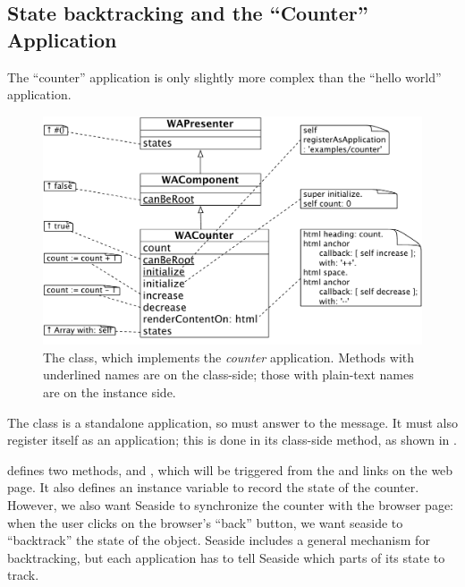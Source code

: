 \documentclass[a4paper,10pt,twoside]{book}
\begin{document}
\subsection{State backtracking and the ``Counter'' Application}

The ``counter'' application is only slightly more complex than the ``hello world'' application.
\label{sec:backtracking}

\begin{figure}[ht]
\begin{center}
\includegraphics[width=\textwidth]{WACounter}
\caption{The  class, which implements the \emph{counter} application.  Methods with underlined names are on the class-side; those with plain-text names are on the instance side.}
\label{fig:WACounter}
\end{center}
\end{figure}

The class  is a standalone application, so  must answer  to the   message.
It must also register itself as an application; this is done in its class-side  method, as shown in .

 defines two methods,  and , which will be triggered from the \link{++} and \link{--\,--} links on the web page.  
It also defines an instance variable  to record the state of the counter.
However, we also want Seaside to synchronize the counter with the browser page:
when the user clicks on the browser's ``back'' button, we want seaside to ``backtrack'' the state of the  object.
Seaside includes a general mechanism for backtracking, but each application has to tell Seaside which parts of its state to track.  
\end{document}
